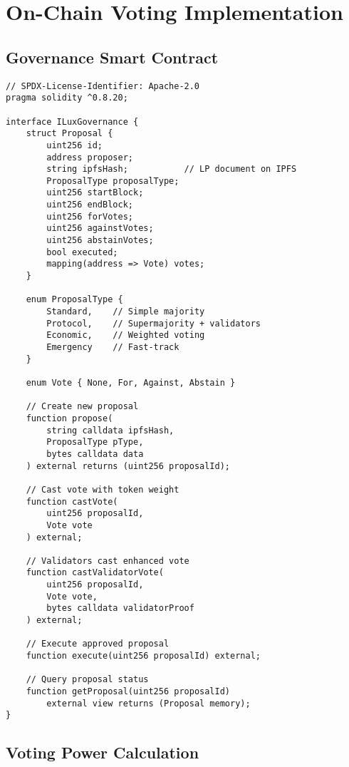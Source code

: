 \documentclass[11pt,a4paper]{article}
\begin{document}
\section{On-Chain Voting Implementation}

\subsection{Governance Smart Contract}

\begin{lstlisting}[language=Solidity,caption=Core governance contract interface]
// SPDX-License-Identifier: Apache-2.0
pragma solidity ^0.8.20;

interface ILuxGovernance {
    struct Proposal {
        uint256 id;
        address proposer;
        string ipfsHash;           // LP document on IPFS
        ProposalType proposalType;
        uint256 startBlock;
        uint256 endBlock;
        uint256 forVotes;
        uint256 againstVotes;
        uint256 abstainVotes;
        bool executed;
        mapping(address => Vote) votes;
    }

    enum ProposalType {
        Standard,    // Simple majority
        Protocol,    // Supermajority + validators
        Economic,    // Weighted voting
        Emergency    // Fast-track
    }

    enum Vote { None, For, Against, Abstain }

    // Create new proposal
    function propose(
        string calldata ipfsHash,
        ProposalType pType,
        bytes calldata data
    ) external returns (uint256 proposalId);

    // Cast vote with token weight
    function castVote(
        uint256 proposalId,
        Vote vote
    ) external;

    // Validators cast enhanced vote
    function castValidatorVote(
        uint256 proposalId,
        Vote vote,
        bytes calldata validatorProof
    ) external;

    // Execute approved proposal
    function execute(uint256 proposalId) external;

    // Query proposal status
    function getProposal(uint256 proposalId)
        external view returns (Proposal memory);
}
\end{lstlisting}

\subsection{Voting Power Calculation}
\end{document}
